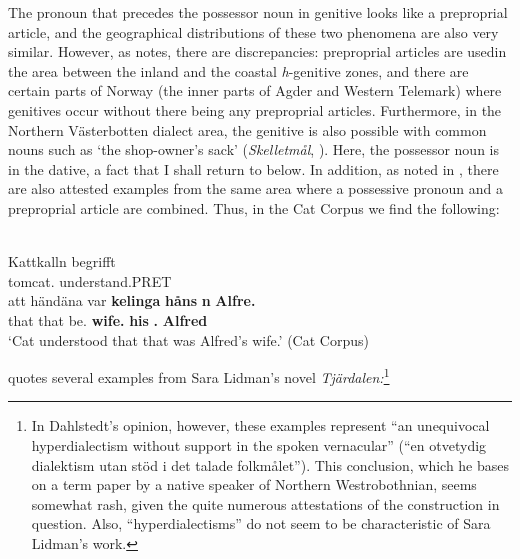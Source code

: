 The pronoun that precedes the possessor noun in genitive looks like a preproprial article, and the geographical distributions of these two phenomena are also very similar. However, as \citet[67]{Delsing2003b} notes, there are discrepancies: preproprial articles are used\textstyleLinguisticExample{ }in the area between the inland and the coastal \textit{h}{}-genitive zones, and there are certain parts of Norway (the inner parts of Agder and Western Telemark) where genitives occur without there being any preproprial articles. Furthermore, in the Northern Västerbotten dialect area, the genitive is also possible with common nouns such as  ‘the shop-owner’s sack’ (\textit{Skelletmål}, \citet[23]{Marklund1976}). Here, the possessor noun is in the dative, a fact that I shall return to below. In addition, as noted in \citet{HolmbergEtAl2003}, there are also attested examples from the same area where a possessive pronoun and a preproprial article are combined. Thus, in the Cat Corpus we find the following:

\ea\label{}
\\
\gll Kattkalln  begrifft\\
tomcat.{}  understand.PRET\\
\gll att  händäna  var  \textbf{kelinga} \textbf{håns} \textbf{n} \textbf{Alfre.}\\
that  that  be.{\pst}  \textbf{wife.{}} \textbf{his} \textbf{{\pda}.{\m}} \textbf{Alfred}\\
\glt  ‘Cat understood that that was Alfred’s wife.’ (Cat Corpus)
\z

\citet[51]{Dahlstedt1971} quotes several examples from Sara Lidman’s novel \textit{Tjärdalen}\textit{:}\footnote{ In Dahlstedt’s opinion, however, these examples represent “an unequivocal hyperdialectism without support in the spoken vernacular” (“en otvetydig dialektism utan stöd i det talade folkmålet”). This conclusion, which he bases on a term paper by a native speaker of Northern Westrobothnian, seems somewhat rash, given the quite numerous attestations of the construction in question. Also, “hyperdialectisms” do not seem to be characteristic of Sara Lidman’s work.\par }



